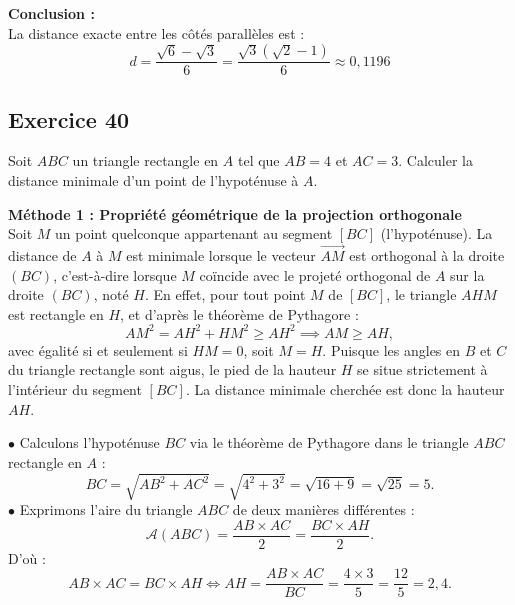 \documentclass[11pt,a4paper]{article}
\begin{document}
\begin{correctionbox}
\textbf{Conclusion :}\\
La distance exacte entre les côtés parallèles est :
\[
\boxed{d = \frac{\sqrt{6} - \sqrt{3}}{6} = \frac{\sqrt{3}(\sqrt{2} - 1)}{6}} \approx 0{,}1196
\]
\end{correctionbox}

\subsection*{Exercice 40}
Soit $ABC$ un triangle rectangle en $A$ tel que $AB = 4$ et $AC = 3$. Calculer la distance minimale d'un point de l'hypoténuse à $A$.

\begin{correctionbox}
\textbf{Méthode 1 : Propriété géométrique de la projection orthogonale}\\
Soit $M$ un point quelconque appartenant au segment $[BC]$ (l'hypoténuse).
La distance de $A$ à $M$ est minimale lorsque le vecteur $\vec{AM}$ est orthogonal à la droite $(BC)$, c'est-à-dire lorsque $M$ coïncide avec le projeté orthogonal de $A$ sur la droite $(BC)$, noté $H$.
En effet, pour tout point $M$ de $[BC]$, le triangle $AHM$ est rectangle en $H$, et d'après le théorème de Pythagore :
\[
AM^2 = AH^2 + HM^2 \ge AH^2 \implies AM \ge AH,
\]
avec égalité si et seulement si $HM = 0$, soit $M = H$.
Puisque les angles en $B$ et $C$ du triangle rectangle sont aigus, le pied de la hauteur $H$ se situe strictement à l'intérieur du segment $[BC]$.
La distance minimale cherchée est donc la hauteur $AH$.

$\bullet$ Calculons l'hypoténuse $BC$ via le théorème de Pythagore dans le triangle $ABC$ rectangle en $A$ :
\[
BC = \sqrt{AB^2 + AC^2} = \sqrt{4^2 + 3^2} = \sqrt{16 + 9} = \sqrt{25} = 5.
\]
$\bullet$ Exprimons l'aire du triangle $ABC$ de deux manières différentes :
\[
\mathcal{A}(ABC) = \frac{AB \times AC}{2} = \frac{BC \times AH}{2}.
\]
D'où :
\[
AB \times AC = BC \times AH \iff AH = \frac{AB \times AC}{BC} = \frac{4 \times 3}{5} = \frac{12}{5} = 2{,}4.
\]


\end{correctionbox}
\end{document}
